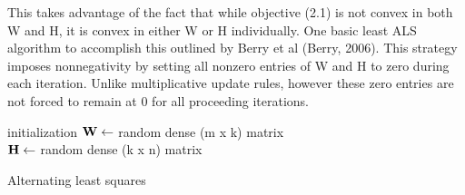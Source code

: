 \documentclass[final,leqno,onefignum,onetabnum]{siamltex1213}
\begin{document}
This takes advantage of the fact that while objective (2.1) is not convex in both W and H, it is convex in either W or H individually. One basic least ALS algorithm to accomplish this outlined by Berry et al (Berry, 2006). This strategy imposes nonnegativity by setting all nonzero entries of W and H to zero during each iteration. Unlike multiplicative update rules, however these zero entries are not forced to remain at 0 for all proceeding iterations. \\

\begin{algorithm}[H]	

 initialization\;
$\bf{W} \gets $ random dense (m x k) matrix\\
$\bf{H} \gets $ random dense (k x n) matrix\\
 \caption{Alternating least squares}
\end{algorithm} 
\end{document}
